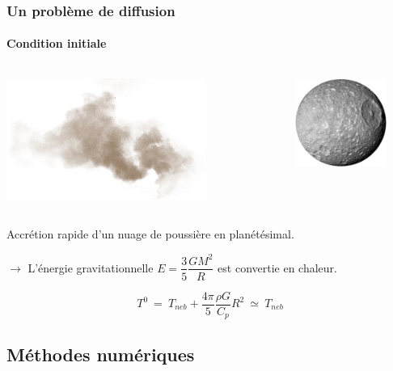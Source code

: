 \documentclass{beamer}
\begin{document}
\begin{frame}
	\frametitle{Un problème de diffusion}
	\framesubtitle{Condition initiale}

\vspace{-1cm}

\begin{columns}
    \begin{column}{7cm}      
	  \center \includegraphics[height = 4cm]{figures/dust.png}  
	\end{column}
	
	\begin{column}{1cm}      
	  \center {\huge $\Rightarrow$}  
	\end{column}

	\begin{column}{5cm}     
      \center \includegraphics[width = 3cm]{figures/mimas.png}
      \vspace{-0.4cm}
	\end{column}
\end{columns}

\center
Accrétion rapide d'un nuage de poussière en planétésimal.
\vspace{0.5cm}

$\rightarrow$ L'énergie gravitationnelle $ E = \dfrac{3}{5} \dfrac{GM^2}{R}$ est convertie en chaleur.

$$T^0 \ =\  T_{neb} + \frac{4\pi}{5}\frac{\rho G}{C_p} R^2 \  \simeq \ T_{neb}$$

\end{frame}

\subsection{Méthodes numériques}
\end{document}
